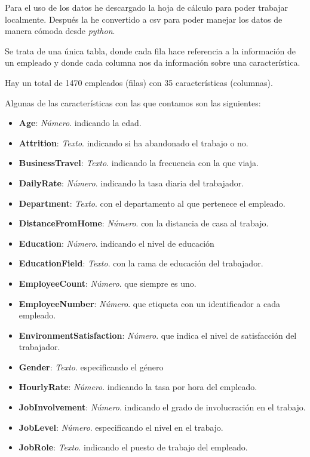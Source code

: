 Para el uso de los datos he descargado la hoja de cálculo para poder trabajar localmente.
Después la he convertido a \acrshort{csv} para poder manejar los datos de manera cómoda desde \textit{python}.


Se trata de una única tabla, donde cada fila hace referencia a la información de un empleado y donde cada columna nos da información sobre una característica.

Hay un total de 1470 empleados (filas) con 35 características (columnas).

Algunas de las características con las que contamos son las siguientes:
\begin{itemize}
\item \textbf{Age}: \textit{Número}. indicando la edad.
\item \textbf{Attrition}: \textit{Texto}. indicando si ha abandonado el trabajo o no.
\item \textbf{BusinessTravel}: \textit{Texto}. indicando la frecuencia con la que viaja.
\item \textbf{DailyRate}: \textit{Número}. indicando la tasa diaria del trabajador.
\item \textbf{Department}: \textit{Texto}. con el departamento al que pertenece el empleado.
\item \textbf{DistanceFromHome}: \textit{Número}. con la distancia de casa al trabajo.
\item \textbf{Education}: \textit{Número}. indicando el nivel de educación
\item \textbf{EducationField}: \textit{Texto}. con la rama de educación del trabajador.
\item \textbf{EmployeeCount}: \textit{Número}. que siempre es uno.
\item \textbf{EmployeeNumber}: \textit{Número}. que etiqueta con un identificador a cada empleado.
\item \textbf{EnvironmentSatisfaction}: \textit{Número}. que indica el nivel de satisfacción del trabajador.
\item \textbf{Gender}: \textit{Texto}. especificando el género
\item \textbf{HourlyRate}: \textit{Número}. indicando la tasa por hora del empleado.
\item \textbf{JobInvolvement}: \textit{Número}. indicando el grado de involucración en el trabajo.
\item \textbf{JobLevel}: \textit{Número}. especificando el nivel en el trabajo.
\item \textbf{JobRole}: \textit{Texto}. indicando el puesto de trabajo del empleado.

\end{itemize}
